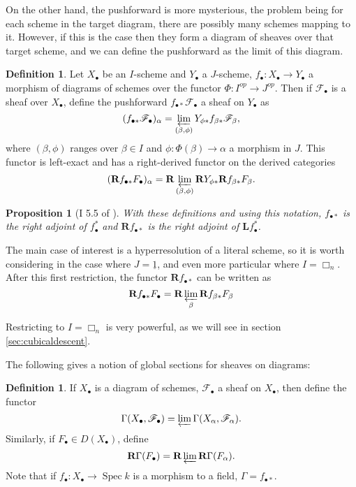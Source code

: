 \documentclass{report}
\newtheorem{prop}[theorem]{Proposition}
\theoremstyle{definition}
\newtheorem{definition}[theorem]{Definition}
\DeclareMathOperator{\Spec}{Spec}
\newcommand{\FF}{\mathscr{F}}
\newcommand{\bL}{\textbf{L}}
\newcommand{\bR}{\textbf{R}}
\begin{document}
On the other hand, the pushforward is more mysterious, the problem being for each scheme in the target diagram, there are possibly many schemes mapping to it.
However, if this is the case then they form a diagram of sheaves over that target scheme, and we can define the pushforward as the limit of this diagram.

\begin{definition}
	\label{def:pushforward}
	Let $X_\bullet$ be an $I$-scheme and $Y_\bullet$ a $J$-scheme, $f_\bullet : X_\bullet \rightarrow Y_\bullet$ a morphism of diagrams of schemes over the functor $\Phi : I^{op} \rightarrow J^{op}$.
	Then if $\FF_\bullet$ is a sheaf over $X_\bullet$, define the pushforward $f_{\bullet*} \FF_\bullet$ a sheaf on $Y_\bullet$ as
	\[
	(f_{\bullet*} \FF_\bullet)_\alpha = \varprojlim_{(\beta, \phi)} Y_{\phi *} f_{\beta *} \FF_\beta,
	\]
	where $(\beta, \phi)$ ranges over $\beta \in I$ and $\phi : \Phi(\beta) \rightarrow \alpha$ a morphism in $J$.
	This functor is left-exact and has a right-derived functor on the derived categories
	\[
	(\bR f_{\bullet*} F_\bullet)_\alpha = \bR \varprojlim_{(\beta, \phi)} \bR Y_{\phi *} \bR f_{\beta *} F_\beta.
	\]
\end{definition}

\begin{prop}[I 5.5 of \cite{Guillen1988}]
	With these definitions and using this notation, $f_{\bullet *}$ is the right adjoint of $f_\bullet^*$ and $\bR f_{\bullet *}$ is the right adjoint of $\bL f_\bullet^*$.
\end{prop}

The main case of interest is a hyperresolution of a literal scheme, so it is worth considering in the case where $J = \underline{1}$, and even more particular where $I = \Box_n$.
After this first restriction, the functor $\bR f_{\bullet *}$ can be written as
\[
\bR f_{\bullet*} F_\bullet = \bR \varprojlim_\beta \bR f_{\beta *} F_\beta
\]

Restricting to $I = \Box_n$ is very powerful, as we will see in section \ref{sec:cubicaldescent}.

The following gives a notion of global sections for sheaves on diagrams:

\begin{definition}
	If $X_\bullet$ is a diagram of schemes, $\FF_\bullet$ a sheaf on $X_\bullet$, then define the functor
	\[
	\Gamma(X_\bullet, \FF_\bullet) = \varprojlim \Gamma(X_\alpha, \FF_\alpha).
	\]
	Similarly, if $F_\bullet \in D(X_\bullet)$, define
	\[
	\bR \Gamma(F_\bullet) = \bR \varprojlim \bR \Gamma(F_\alpha).
	\]
	Note that if $f_\bullet : X_\bullet \rightarrow \Spec k$ is a morphism to a field, $\Gamma = f_{\bullet *}$.
\end{definition}
\end{document}

